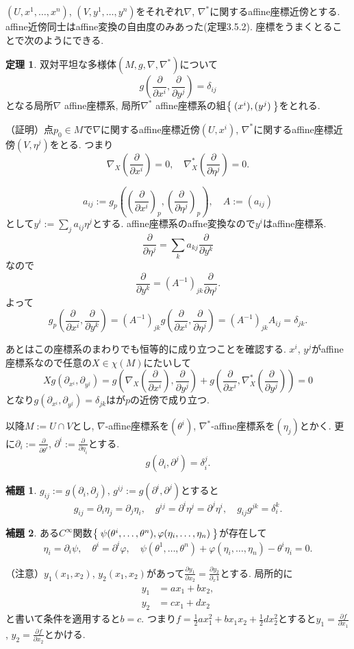 \documentclass{jsarticle}
\newcommand{\half}{\frac{1}{2}}
\newcommand{\con}{\nabla}
\newcommand{\dcon}{\con^{*}}
\newcommand{\marud}[1]{\partial_{#1}}
\newcommand{\marudd}[1]{\frac{\partial}{\partial #1}}
\theoremstyle{definition}
\newtheorem{theorem}{定理}
\newtheorem{lemma}{補題}
\numberwithin{theorem}{section}
\begin{document}
$(U, x^1, \dots, x^n)$, $(V, y^1, \dots, y^n)$をそれぞれ$\con$, $\dcon$に関するaffine座標近傍とする.
affine近傍同士はaffine変換の自由度のみあった(定理3.5.2).
座標をうまくとることで次のようにできる.
\begin{theorem}
双対平坦な多様体$(M,g,\con,\dcon)$について
\[
g(\marudd{x^i}, \marudd{y^j})=\delta_{ij}
\]
となる局所$\con$ affine座標系, 局所$\dcon$ affine座標系の組$\Set{(x^i),(y^j)}$をとれる.
\end{theorem}

（証明）点$p_0 \in M$で$\con$に関するaffine座標近傍$(U,x^i)$, $\dcon$に関するaffine座標近傍$(V,\eta^j)$をとる.
つまり
\[
\con_X\left(\marudd{x^i}\right)=0, \quad \dcon_X\left(\marudd{\eta^j}\right)=0.
\]

\[
a_{ij}:=g_p((\marudd{x^i})_p, (\marudd{\eta^j})_p), \quad A:=(a_{ij})
\]
として$y^i:=\sum_j a_{ij} \eta^j$とする.
affine座標系のaffne変換なので$y^i$はaffine座標系.
\[
\marudd{\eta^j}=\sum_k a_{kj} \marudd{y^k}
\]
なので
\[
\marudd{y^k}=(A^{-1})_{jk} \marudd{\eta^j}.
\]
よって
\[
g_p(\marudd{x^i},\marudd{y^k})=(A^{-1})_{jk}g(\marudd{x^i},\marudd{\eta^j})=(A^{-1})_{jk}A_{ij}=\delta_{jk}.
\]

あとはこの座標系のまわりでも恒等的に成り立つことを確認する.
$x^i$, $y^j$がaffine座標系なので任意の$X \in \chi(M)$にたいして
\[
Xg(\marud{x^i},\marud{y^j})=g(\con_X(\marudd{x^i}),\marudd{y^j})+g(\marudd{x^i},\dcon_X(\marudd{y^j}))=0
\]
となり$g(\marud{x^i},\marud{y^j})=\delta_{jk}$はが$p$の近傍で成り立つ.

以降$M:=U \cap V$とし, $\con$-affine座標系を$(\theta^i)$, $\dcon$-affine座標系を$(\eta_j)$とかく.
更に$\partial_i:=\marudd{\theta^i}$, $\partial^i:=\marudd{\eta_i}$とする.
\[
g(\partial_i,\partial^j)=\delta_i^j.
\]

\begin{lemma}
$g_{ij}:=g(\partial_i,\partial_j)$, $g^{ij}:=g(\partial^i, \partial^j)$とすると
\[
g_{ij}=\partial_i \eta_j=\partial_j \eta_i, \quad g^{ij}=\partial^i \eta^j = \partial^j \eta^i, \quad g_{ij}g^{jk}=\delta_i^k.
\]
\end{lemma}

\begin{lemma}
ある$C^\infty$関数$\Set{\psi(\theta^i,\dots,\theta^n), \varphi(\eta_i,\dots,\eta_n)}$が存在して
\[
\eta_i=\partial_i\psi, \quad \theta^i=\partial^i \varphi, \quad \psi(\theta^1, \dots, \theta^n)+\varphi(\eta_i,\dots,\eta_n)-\theta^i \eta_i=0.
\]
\end{lemma}
（注意）$y_1(x_1,x_2)$, $y_2(x_1,x_2)$があって$\frac{\partial y_1}{\partial x_2}=\frac{\partial y_2}{\partial_x1}$とする.
局所的に
\begin{eqnarray*}
y_1&=a x_1+b x_2,\\
y_2&=c x_1+d x_2
\end{eqnarray*}
と書いて条件を適用すると$b=c$.
つまり$f=\half a x_1^2+b x_1 x_2 + \half d x_2^2$とすると$y_1=\frac{\partial f}{\partial x_1}$, $y_2=\frac{\partial f}{\partial x_2}$とかける.
\end{document}
